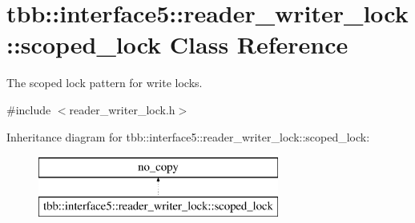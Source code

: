 \hypertarget{classtbb_1_1interface5_1_1reader__writer__lock_1_1scoped__lock}{}\section{tbb\+:\+:interface5\+:\+:reader\+\_\+writer\+\_\+lock\+:\+:scoped\+\_\+lock Class Reference}
\label{classtbb_1_1interface5_1_1reader__writer__lock_1_1scoped__lock}


The scoped lock pattern for write locks.  




{\ttfamily \#include $<$reader\+\_\+writer\+\_\+lock.\+h$>$}

Inheritance diagram for tbb\+:\+:interface5\+:\+:reader\+\_\+writer\+\_\+lock\+:\+:scoped\+\_\+lock\+:\begin{figure}[H]
\begin{center}
\leavevmode
\includegraphics[height=2.000000cm]{classtbb_1_1interface5_1_1reader__writer__lock_1_1scoped__lock}
\end{center}
\end{figure}
